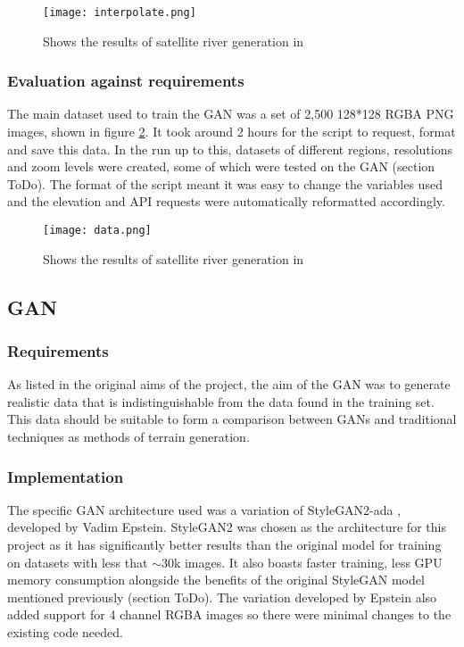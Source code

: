 \documentclass[a4paper]{report}
\begin{document}
\begin{figure}[H]
    \centering
        \texttt{[image: interpolate.png]}
        \caption{Shows the results of satellite river generation in}
        \label{fig:interpolate}
\end{figure}

\subsubsection{Evaluation against requirements}
The main dataset used to train the GAN was a set of 2,500 128*128 RGBA PNG images, shown in figure \ref{fig:data}. It took around 2 hours for the script to request, format and save this data. In the run up to this, datasets of different regions, resolutions and zoom levels were created, some of which were tested on the GAN (section ToDo). The format of the script meant it was easy to change the variables used and the elevation and API requests were automatically reformatted accordingly.

\begin{figure}[H]
    \centering
        \texttt{[image: data.png]}
        \caption{Shows the results of satellite river generation in}
        \label{fig:data}
\end{figure}

\subsection{GAN}
\subsubsection{Requirements}
As listed in the original aims of the project, the aim of the GAN was to generate realistic data that is indistinguishable from the data found in the training set. This data should be suitable to form a comparison between GANs and traditional techniques as methods of terrain generation.

\subsubsection{Implementation}
The specific GAN architecture used was a variation of StyleGAN2-ada \cite{ToDo}, developed by Vadim Epstein. StyleGAN2 was chosen as the architecture for this project as it has significantly better results than the original model for training on datasets with less that $\sim$30k images. It also boasts faster training, less GPU memory consumption alongside the benefits of the original StyleGAN model mentioned previously (section ToDo). The variation developed by Epstein also added support for 4 channel RGBA images so there were minimal changes to the existing code needed.
\end{document}
